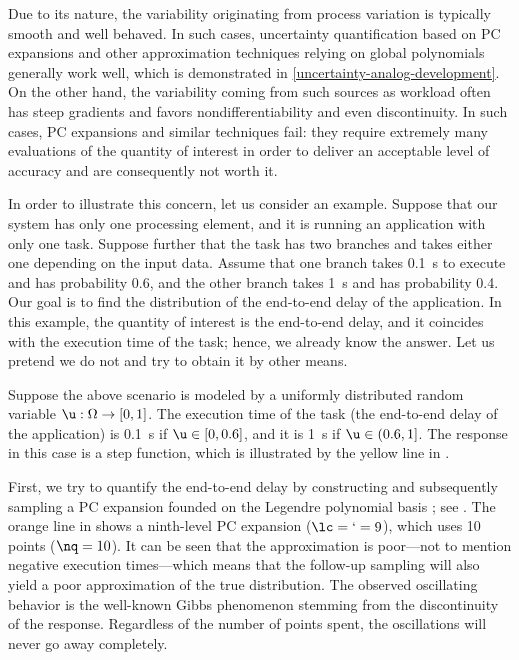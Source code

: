 Due to its nature, the variability originating from process variation is
typically smooth and well behaved. In such cases, uncertainty quantification
based on \ac{PC} expansions \cite{xiu2010} and other approximation techniques
relying on global polynomials generally work well, which is demonstrated in
\cref{uncertainty-analog-development}. On the other hand, the variability coming
from such sources as workload often has steep gradients and favors
nondifferentiability and even discontinuity. In such cases, \ac{PC} expansions
and similar techniques fail: they require extremely many evaluations of the
quantity of interest in order to deliver an acceptable level of accuracy and are
consequently not worth it.

In order to illustrate this concern, let us consider an example. Suppose that
our system has only one processing element, and it is running an application
with only one task. Suppose further that the task has two branches and takes
either one depending on the input data. Assume that one branch takes 0.1~s to
execute and has probability 0.6, and the other branch takes 1~s and has
probability 0.4. Our goal is to find the distribution of the end-to-end delay of
the application. In this example, the quantity of interest is the end-to-end
delay, and it coincides with the execution time of the task; hence, we already
know the answer. Let us pretend we do not and try to obtain it by other means.

Suppose the above scenario is modeled by a uniformly distributed random variable
$\u: \Omega \to [0, 1]$. The execution time of the task (the end-to-end delay of
the application) is 0.1~s if $\u \in [0, 0.6]$, and it is 1~s if $\u \in (0.6,
1]$. The response in this case is a step function, which is illustrated by the
yellow line in .

First, we try to quantify the end-to-end delay by constructing and subsequently
sampling a \ac{PC} expansion founded on the Legendre polynomial basis
\cite{xiu2010}; see . The orange line in
 shows a ninth-level \ac{PC} expansion ($\lc = \lq = 9$),
which uses 10 points ($\nq = 10$). It can be seen that the approximation is
poor---not to mention negative execution times---which means that the follow-up
sampling will also yield a poor approximation of the true distribution. The
observed oscillating behavior is the well-known Gibbs phenomenon stemming from
the discontinuity of the response. Regardless of the number of points spent, the
oscillations will never go away completely.

